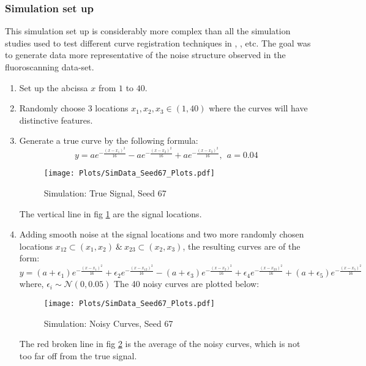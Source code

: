 \subsubsection*{Simulation set up}
This simulation set up is considerably more complex than all the simulation studies used to test different curve registration techniques in \cite{Kneip_Ramsay_2008_JASA}, \cite{Srivastava_etal_2011_v2_arXiv}, etc. The goal was to generate data more representative of the noise structure observed in the fluoroscanning data-set. 
\begin{enumerate}
\item Set up the abcissa $x$ from $1$ to $40$.

\item Randomly choose 3 locations $x_1, x_2, x_3 \in (1, 40)$ where the curves will have distinctive features.

\item Generate a true curve by the following formula:
\[ y = ae^{-\frac{(x - x_1)^2}{16}} - ae^{-\frac{(x - x_2)^2}{16}} + ae^{-\frac{(x - x_3)^2}{16}},\ \ a=0.04  \]
\begin{figure}[H]
\begin{center}
\texttt{[image: Plots/SimData\_Seed67\_Plots.pdf]}
\end{center}
\caption{Simulation: True Signal, Seed 67}
\label{fig:FigSim_True}
\end{figure}
The vertical line in fig \ref{fig:FigSim_True} are the signal locations.

\item Adding smooth noise at the signal locations and two more randomly chosen locations $x_{12} \subset (x_1, x_2) \ \& \ x_{23} \subset (x_2, x_3) $, the resulting curves are of the form:
\[ y = (a + \epsilon_1)e^{-\frac{(x - x_1)^2}{16}} + \epsilon_2e^{-\frac{(x - x_12)^2}{16}} - (a + \epsilon_3)e^{-\frac{(x - x_2)^2}{16}} + \epsilon_4e^{-\frac{(x - x_23)^2}{16}} + (a + \epsilon_5)e^{-\frac{(x - x_5)^2}{16}}\]
where, $\epsilon_i \sim \mathcal{N}(0, 0.05)$
The 40 noisy curves are plotted below:
\begin{figure}[H]
\begin{center}
\texttt{[image: Plots/SimData\_Seed67\_Plots.pdf]}
\end{center}
\caption{Simulation: Noisy Curves, Seed 67}
\label{fig:FigSim_Noisy}
\end{figure}
The red broken line in fig \ref{fig:FigSim_Noisy} is the average of the noisy curves, which is not too far off from the true signal. 


\end{enumerate}
